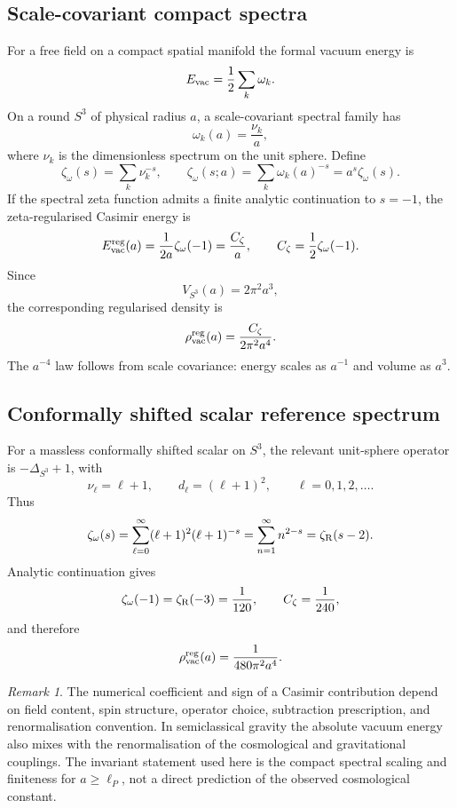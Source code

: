 \documentclass[reprint,aps,prd,letterpaper,superscriptaddress,nofootinbib,longbibliography,floatfix]{revtex4-2}
\theoremstyle{remark}
\newtheorem{remark}[theorem]{Remark}
\newcommand{\Riemann}{\zeta_{\rm R}}
\newcommand{\Czeta}{C_\zeta}
\begin{document}
\subsection{Scale-covariant compact spectra}

For a free field on a compact spatial manifold the formal vacuum energy is
\[
  E_{\rm vac}=\frac12\sum_k\omega_k .
\]
On a round \(S^3\) of physical radius \(a\), a scale-covariant spectral family
has
\[
  \omega_k(a)=\frac{\nu_k}{a},
\]
where \(\nu_k\) is the dimensionless spectrum on the unit sphere.  Define
\[
  \zeta_\omega(s)=\sum_k\nu_k^{-s},
  \qquad
  \zeta_\omega(s;a)=\sum_k\omega_k(a)^{-s}=a^s\zeta_\omega(s).
\]
If the spectral zeta function admits a finite analytic continuation to \(s=-1\),
the zeta-regularised Casimir energy is
\[
  E_{\rm vac}^{\rm reg}(a)=\frac{1}{2a}\zeta_\omega(-1)
  =\frac{\Czeta}{a},
  \qquad
  \Czeta=\frac12\zeta_\omega(-1).
\]
Since
\[
  V_{S^3}(a)=2\pi^2a^3,
\]
the corresponding regularised density is
\[
  \rho_{\rm vac}^{\rm reg}(a)
  =\frac{\Czeta}{2\pi^2a^4}.
\]
The \(a^{-4}\) law follows from scale covariance: energy scales as \(a^{-1}\)
and volume as \(a^3\).

\subsection{Conformally shifted scalar reference spectrum}

For a massless conformally shifted scalar on \(S^3\), the relevant unit-sphere
operator is \(-\Delta_{S^3}+1\), with
\[
  \nu_\ell=\ell+1,\qquad d_\ell=(\ell+1)^2,\qquad
  \ell=0,1,2,\ldots .
\]
Thus
\[
  \zeta_\omega(s)
  =\sum_{\ell=0}^\infty(\ell+1)^2(\ell+1)^{-s}
  =\sum_{n=1}^\infty n^{2-s}
  =\Riemann(s-2).
\]
Analytic continuation gives
\[
  \zeta_\omega(-1)=\Riemann(-3)=\frac1{120},
  \qquad
  \Czeta=\frac1{240},
\]
and therefore
\[
  \rho_{\rm vac}^{\rm reg}(a)=\frac{1}{480\pi^2a^4}.
\]

\begin{remark}
The numerical coefficient and sign of a Casimir contribution depend on field
content, spin structure, operator choice, subtraction prescription, and
renormalisation convention.  In semiclassical gravity the absolute vacuum energy
also mixes with the renormalisation of the cosmological and gravitational
couplings.  The invariant statement used here is the compact spectral scaling
and finiteness for \(a\ge\ell_P\), not a direct prediction of the observed
cosmological constant.
\end{remark}
\end{document}
